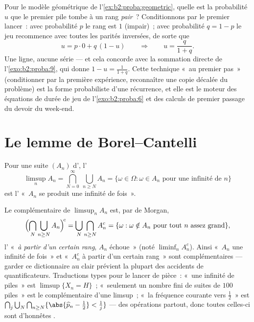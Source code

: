 \begin{example}\label{ex:b2:proba:firststep}
Pour le modèle géométrique de l'\cref{ex:b2:proba:geometric},
quelle est la probabilité $u$ que le premier pile tombe à un rang
\emph{pair}~? Conditionnons par le premier lancer~: avec probabilité
$p$ le rang est $1$ (impair)~; avec probabilité $q = 1 - p$ le
jeu recommence avec toutes les parités inversées, de sorte que
\[
u = p\cdot0 + q\,(1 - u)
\qquad\Longrightarrow\qquad
u = \frac{q}{1 + q} .
\]
Une ligne, aucune série --- et cela concorde avec la sommation
directe de l'\cref{exo:b2:proba:9}, qui donne $1 - u =
\frac1{1+q}$. Cette technique «~au premier pas~» (conditionner par
la première expérience, reconnaître une copie décalée du
problème) est la forme probabiliste d'une récurrence, et elle est
le moteur des équations de durée de jeu de
l'\cref{exo:b2:proba:6} et des calculs de premier passage du
devoir du week-end.
\end{example}

\section{Le lemme de Borel--Cantelli}

\begin{definition}\label{def:b2:proba:limsup}
Pour une suite $(A_n)$ d', l'
\[
\limsup_n A_n
= \bigcap_{N=0}^{\infty}\ \bigcup_{n \geq N} A_n
= \{\omega \in \Omega : \omega \in A_n
\text{ pour une infinité de } n\}
\]
est l' «~$A_n$ se produit une infinité de fois~».
\end{definition}

\begin{example}\label{ex:b2:proba:limsuplang}
Le complémentaire de $\limsup_nA_n$ est, par de Morgan,
\[
\Bigl(\bigcap_N\bigcup_{n\geq N}A_n\Bigr)^{\!c}
= \bigcup_N\bigcap_{n\geq N}A_n^c
= \{\omega : \omega \notin A_n \text{ pour tout $n$ assez grand}\},
\]
l' «~\emph{à partir d'un certain rang}, $A_n$ échoue~» (noté
$\liminf_nA_n^c$). Ainsi «~$A_n$ une infinité de fois~» et
«~$A_n^c$ à partir d'un certain rang~» sont complémentaires --- garder ce
dictionnaire au clair prévient la plupart des accidents de quantificateurs.
Traductions types pour le lancer de pièce~: «~une infinité de
piles~» est $\limsup\{X_n = H\}$~; «~seulement un nombre fini de suites
de $100$ piles~» est le complémentaire d'une limsup~; «~la
fréquence courante  vers $\frac12$~» est
$\bigcap_j\bigcup_N\bigcap_{n\geq N}\{\abs{\widehat p_n -
\tfrac12} < \tfrac1j\}$ --- des opérations  partout,
donc toutes celles-ci sont d'honnêtes .
\end{example}

